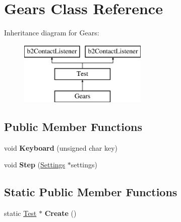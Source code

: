 \hypertarget{class_gears}{\section{Gears Class Reference}
\label{class_gears}
}
Inheritance diagram for Gears\-:\begin{figure}[H]
\begin{center}
\leavevmode
\includegraphics[height=3.000000cm]{class_gears}
\end{center}
\end{figure}
\subsection*{Public Member Functions}
\begin{DoxyCompactItemize}
\item 
\hypertarget{class_gears_a2525d74e286dac77e25026e2a9ded902}{void {\bfseries Keyboard} (unsigned char key)}\label{class_gears_a2525d74e286dac77e25026e2a9ded902}

\item 
\hypertarget{class_gears_a91f8d0f0dcd80ef546392bb6d76e7ce7}{void {\bfseries Step} (\hyperlink{struct_settings}{Settings} $\ast$settings)}\label{class_gears_a91f8d0f0dcd80ef546392bb6d76e7ce7}

\end{DoxyCompactItemize}
\subsection*{Static Public Member Functions}
\begin{DoxyCompactItemize}
\item 
\hypertarget{class_gears_a9a7194512a71b5eef9006b6f1fd2186f}{static \hyperlink{class_test}{Test} $\ast$ {\bfseries Create} ()}\label{class_gears_a9a7194512a71b5eef9006b6f1fd2186f}

\end{DoxyCompactItemize}
